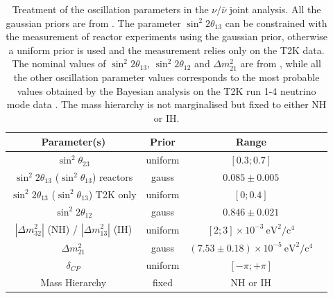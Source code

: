 \begin{table}
\centering
 \begin{tabular}{| c | c | c | c |}
 \hline
 Parameter(s)                                               		   		& Prior		& Range    \\
\hline
$\sin^{2}\theta_{23}$                                       				&  uniform 	& $[0.3; 0.7]$      \\
$\sin^{2} 2 \theta_{13}$ ($\sin^{2} \theta_{13}$) reactors		&  gauss 		& $0.085 \pm 0.005$ 	\\
$\sin^{2} 2 \theta_{13}$ ($\sin^{2} \theta_{13}$) T2K only	   	&  uniform		& $[0; 0.4]$ 	\\
$\sin^{2} 2 \theta_{12}$  								&  gauss 		& $0.846 \pm 0.021$ \\
$|\Delta m^{2}_{32}|$ (NH) / $|\Delta m^{2}_{13}|$ (IH)      		&  uniform		& $ [2; 3] \times 10^{-3}~\mbox{eV}^2/\mbox{c}^4$		 \\
$\Delta m^{2}_{21}$      								&  gauss 		& $(7.53 \pm 0.18) \times 10^{-5}~\mbox{eV}^2/\mbox{c}^4$		\\
$\delta_{CP}$                                               				&  uniform 	& $[-\pi; +\pi]$ \\
Mass Hierarchy										&  fixed 		& NH or IH \\  
\hline
\end{tabular}
\caption{
Treatment of the oscillation parameters in the 
$\nu/\bar{\nu}$ joint analysis.
All the gaussian priors are from \cite{pdg_2014}.
The parameter $\sin^{2} 2 \theta_{13}$ can be constrained with
the measurement of reactor experiments using the gaussian prior,
otherwise a uniform prior is used
and the measurement relies only on the T2K data.
The nominal values of 
$\sin^2 2 \theta_{13}$, 
$\sin^2 2 \theta_{12}$
and 
$\Delta m^2_{21}$ 
are from \cite{pdg_2014},
while all the other oscillation parameter values corresponds to the most probable values 
obtained by the Bayesian analysis on the T2K run 1-4 neutrino mode data \cite{T2KLongPaper}.
The mass hierarchy is not marginalised but fixed to either NH or IH.
}
\label{tab:osc_params_joint_priors}
\end{table}

